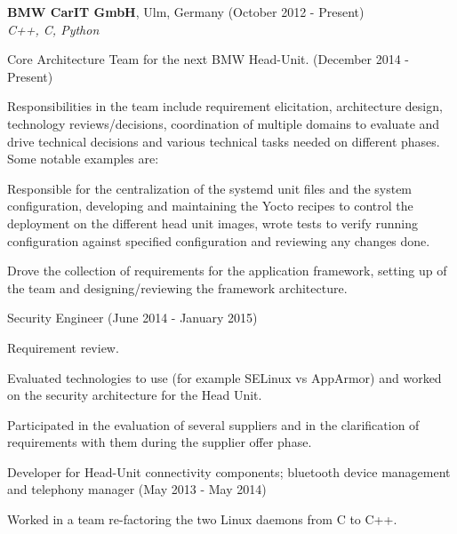 \documentclass[alan.tex]{subfiles}
\begin{document}
  \item \textbf{BMW CarIT GmbH}, Ulm, Germany (October 2012 - Present)\\
    \emph{C++, C, Python}
    \begin{my_desc}
      \item[Core Architecture Team] for the next BMW Head-Unit. (December 2014 - Present)
        \begin{my_bullets}
          \item Responsibilities in the team include requirement elicitation, architecture design,
            technology reviews/decisions, coordination of multiple domains to evaluate and drive technical
            decisions and various technical tasks needed on different phases. Some notable examples are:
            \begin{my_bullets}
            \item Responsible for the centralization of the systemd unit files and the system configuration,
              developing and maintaining the Yocto recipes to control the deployment on the different head
              unit images, wrote tests to verify running configuration against specified configuration and
              reviewing any changes done.
            \item Drove the collection of requirements for the application framework, setting up of the team
              and designing/reviewing the framework architecture.
            \end{my_bullets}
        \end{my_bullets}
      \item[Security Engineer] (June 2014 - January 2015)
        \begin{my_bullets}
          \item Requirement review.
          \item Evaluated technologies to use (for example SELinux vs AppArmor) and worked on the security architecture
            for the Head Unit.
          \item Participated in the evaluation of several suppliers and in the clarification of requirements with
            them during the supplier offer phase.
        \end{my_bullets}
      \item[Developer] for Head-Unit connectivity components; bluetooth device management and telephony manager (May 2013 - May 2014)
        \begin{my_bullets}
          \item Worked in a team re-factoring the two Linux daemons from C to C++.

\end{my_bullets}
\end{my_desc}
\end{document}
